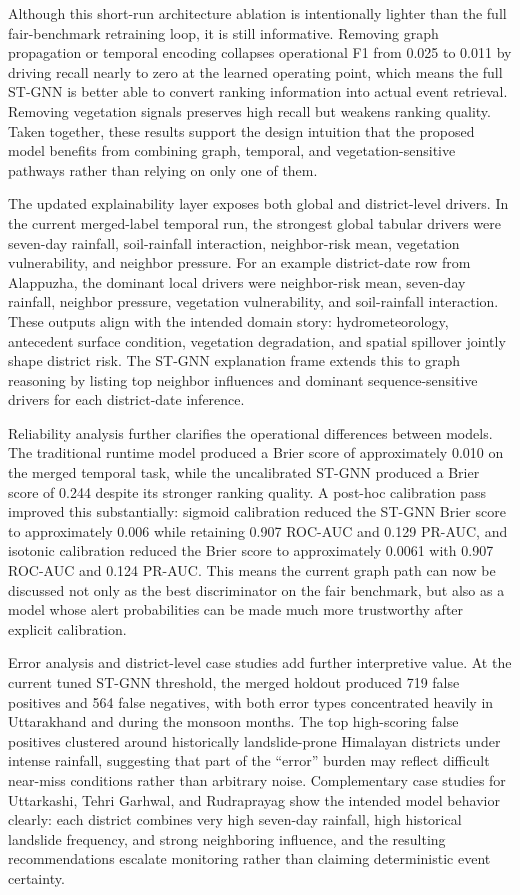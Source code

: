 \documentclass[pdflatex,sn-mathphys-num]{sn-jnl}
\begin{document}
Although this short-run architecture ablation is intentionally lighter than the full fair-benchmark retraining loop, it is still informative. Removing graph propagation or temporal encoding collapses operational F1 from 0.025 to 0.011 by driving recall nearly to zero at the learned operating point, which means the full ST-GNN is better able to convert ranking information into actual event retrieval. Removing vegetation signals preserves high recall but weakens ranking quality. Taken together, these results support the design intuition that the proposed model benefits from combining graph, temporal, and vegetation-sensitive pathways rather than relying on only one of them.

The updated explainability layer exposes both global and district-level drivers. In the current merged-label temporal run, the strongest global tabular drivers were seven-day rainfall, soil-rainfall interaction, neighbor-risk mean, vegetation vulnerability, and neighbor pressure. For an example district-date row from Alappuzha, the dominant local drivers were neighbor-risk mean, seven-day rainfall, neighbor pressure, vegetation vulnerability, and soil-rainfall interaction. These outputs align with the intended domain story: hydrometeorology, antecedent surface condition, vegetation degradation, and spatial spillover jointly shape district risk. The ST-GNN explanation frame extends this to graph reasoning by listing top neighbor influences and dominant sequence-sensitive drivers for each district-date inference.

Reliability analysis further clarifies the operational differences between models. The traditional runtime model produced a Brier score of approximately 0.010 on the merged temporal task, while the uncalibrated ST-GNN produced a Brier score of 0.244 despite its stronger ranking quality. A post-hoc calibration pass improved this substantially: sigmoid calibration reduced the ST-GNN Brier score to approximately 0.006 while retaining 0.907 ROC-AUC and 0.129 PR-AUC, and isotonic calibration reduced the Brier score to approximately 0.0061 with 0.907 ROC-AUC and 0.124 PR-AUC. This means the current graph path can now be discussed not only as the best discriminator on the fair benchmark, but also as a model whose alert probabilities can be made much more trustworthy after explicit calibration.

Error analysis and district-level case studies add further interpretive value. At the current tuned ST-GNN threshold, the merged holdout produced 719 false positives and 564 false negatives, with both error types concentrated heavily in Uttarakhand and during the monsoon months. The top high-scoring false positives clustered around historically landslide-prone Himalayan districts under intense rainfall, suggesting that part of the ``error'' burden may reflect difficult near-miss conditions rather than arbitrary noise. Complementary case studies for Uttarkashi, Tehri Garhwal, and Rudraprayag show the intended model behavior clearly: each district combines very high seven-day rainfall, high historical landslide frequency, and strong neighboring influence, and the resulting recommendations escalate monitoring rather than claiming deterministic event certainty.
\end{document}
